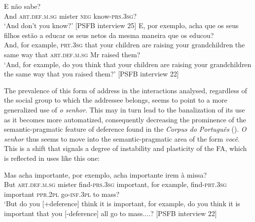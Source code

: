 \documentclass[output=paper]{langscibook}
\begin{document}
\ea\label{ex:marques:24}
\gll E                    não    sabe?\\
         And  \textsc{art.def.m.sg}    mister      \textsc{neg}    know-\textsc{prs.3sg}?\\
\glt ‘And don’t you know?’ [PSFB interview 25]
\ex\label{ex:marques:25}
\gll E,    por exemplo,    acha       {que os seus filhos estão a educar os seus} netos         da mesma maneira que                            os educou?\\
        And, for example,    \textsc{prt.3sg} {that your children are raising your} grandchildren the same way that              \textsc{art.def.m.sg}   Mr    raised them?\\
\glt ‘And, for example, do you think that your children are raising your grandchildren the same way that you raised them?’ [PSFB interview 22]
\z 


The prevalence of this form of address in the interactions analysed, regardless of the social group to which the addressee belongs, seems to point to a more generalized use of \textit{o senhor}. This may in turn lead to the banalization of its use as it becomes more automatized, consequently decreasing the prominence of the semantic-pragmatic feature of deference found in the \textit{Corpus do Português} (\citealt{DaviesFerreira2016}). \textit{O senhor} thus seems to move into the se\-man\-tic-prag\-mat\-ic area of the form \textit{você}. This is a shift that signals a degree of instability and plasticity of the FA, which is reflected in uses like this one: 

\ea\label{ex:marques:26}
\gll Mas                  acha       importante,      por exemplo, acha      importante          irem      à missa?\\
         But  \textsc{art.def.m.sg}   mister    find-\textsc{prs.3sg}  {important},    for example, find-\textsc{prt.3sg}  important    \textsc{ppr.2pl} go-\textsc{inf.3pl}    to mass?\\
\glt ‘But do you [+deference] think it is important, for example, do you think it is important that you [-deference]  all go to mass....? [PSFB interview 22]
\z 
\end{document}
